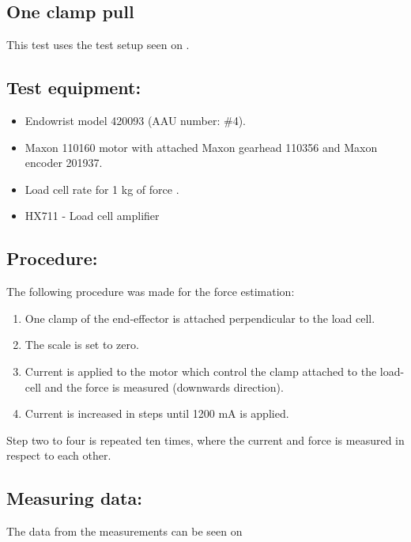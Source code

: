\subsection{One clamp pull} %
This test uses the test setup seen on .

\subsection*{Test equipment:}
\begin{itemize}
\item Endowrist model 420093 (AAU number: \#4).
\item Maxon 110160 motor with attached Maxon gearhead 110356 and Maxon encoder 201937.
\item Load cell rate for 1 kg of force \cite{Load_cell_1kg}.
\item HX711 - Load cell amplifier \cite{HX711}
\end{itemize}

\subsection*{Procedure:}
The following procedure was made for the force estimation:
\begin{enumerate}
\item One clamp of the end-effector is attached perpendicular to the load cell. 
\item The scale is set to zero.
\item Current is applied to the motor which control the clamp attached to the load-cell and the force is measured (downwards direction).
\item Current is increased in steps until 1200 mA is applied.
\end{enumerate}
Step two to four is repeated ten times, where the current and force is measured in respect to each other. 


\subsection*{Measuring data:}
The data from the measurements can be seen on %




